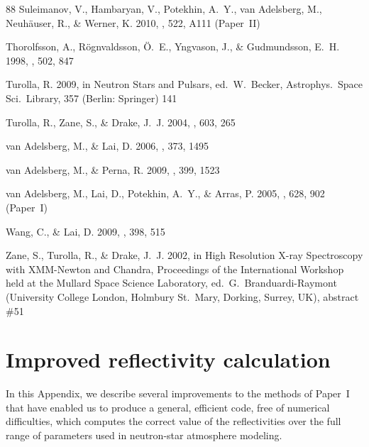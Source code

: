 \documentclass{aa}
\begin{document}
\begin{thebibliography}{88}
Suleimanov, V., Hambaryan, V., Potekhin, A.~Y., van Adelsberg, M., 
Neuh\"auser, R., \& Werner, K.
2010,
\aap, 522, A111 (Paper~II)

Thorolfsson, A., R\"ognvaldsson, \"O.~E., Yngvason, J., \& Gudmundsson, E.~H.
1998,
\apj, 502, 847

Turolla, R.
 2009,
in {Neutron Stars
 and Pulsars}, ed.\ W.~Becker, 
 Astrophys.\ Space Sci.\ Library, {357} 
(Berlin: Springer)
  141
  
Turolla, R., Zane, S., \& Drake, J.~J.
2004,
\apj, 603, 265

van Adelsberg, M., \& Lai, D.
2006,
\mnras, 373, 1495

van Adelsberg, M., \& Perna, R.
2009,
\mnras, 399, 1523

van Adelsberg, M., Lai, D., Potekhin, A.~Y., \& Arras, P.
 2005,
\apj, 628, 902 (Paper~I)

Wang, C., \& Lai, D.
2009,
\mnras, 398, 515

Zane, S., Turolla, R., \& Drake, J.~J.
2002,
in High Resolution X-ray Spectroscopy with XMM-Newton and
Chandra, Proceedings of the International Workshop held at the
Mullard Space Science Laboratory,
ed.\ G.~Branduardi-Raymont
 (University College London,
Holmbury St.~Mary, Dorking, Surrey, UK), abstract \#51

\end{thebibliography}

\appendix
\section{Improved reflectivity calculation}
\label{sect:Improved}

In this Appendix, we describe several improvements to the methods
of Paper~I that have enabled us to produce a general, efficient
code, free of numerical difficulties, which computes the correct
value of the reflectivities  over the full range of parameters
used in neutron-star atmosphere modeling.
\end{document}
